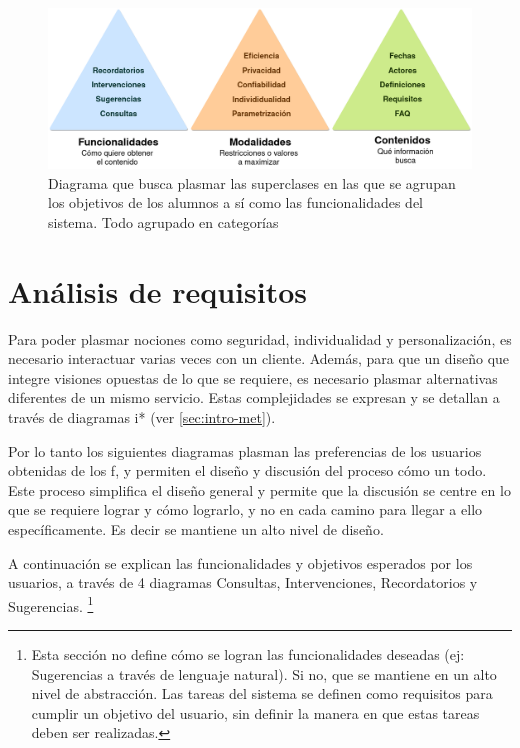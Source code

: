         \begin{figure}[h!]
            \centering
            \includegraphics[width=\textwidth]{media/imagenes/focus_groups/objetivos_y_cualidades.png}
            \caption[Diagrama Tipos de Interacción]{Diagrama que busca plasmar las superclases en las que se agrupan los objetivos de los alumnos a sí como las funcionalidades del sistema. Todo agrupado en categorías}
            \label{fig:my_label}
        \end{figure}

\section{Análisis de requisitos}
        \par Para poder plasmar nociones como seguridad, individualidad y personalización, es necesario interactuar varias veces con un cliente. Además, para que un diseño que integre visiones opuestas de lo que se requiere, es necesario plasmar alternativas diferentes de un mismo servicio. Estas complejidades se expresan y se detallan a través de diagramas i* (ver \ref{sec:intro-met}).
        \par Por lo tanto los siguientes diagramas plasman las preferencias de los usuarios obtenidas de los \acrlong{f}, y permiten el diseño y discusión del proceso cómo un todo. Este proceso simplifica el diseño general y permite que la discusión se centre en lo que se requiere lograr y cómo lograrlo, y no en cada camino para llegar a ello específicamente. Es decir se mantiene un alto nivel de diseño.
        \par A continuación se explican las funcionalidades y objetivos esperados por los usuarios, a través de 4 diagramas Consultas, Intervenciones, Recordatorios y Sugerencias. \footnote{Esta sección no define cómo se logran las funcionalidades deseadas (ej: Sugerencias a través de lenguaje natural). Si no, que se mantiene en un alto nivel de abstracción. Las tareas del sistema se definen como requisitos para cumplir un objetivo del usuario, sin definir la manera en que estas tareas deben ser realizadas.}
    
